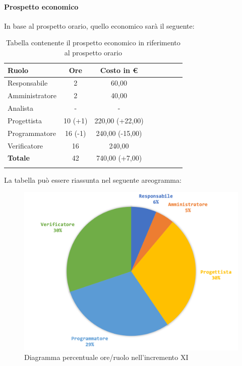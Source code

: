 		\paragraph{Prospetto economico}
		In base al prospetto orario, quello economico sarà il seguente: 
		
		\begin{longtable}{|l|c|c|c|c|c|c|c|}
			\hline
			\rowcolor{lighter-grayer}
			\textbf{Ruolo} & \textbf{Ore} & \textbf{Costo in € } \\
			\hline
			\endfirsthead
			
			\hline
			Responsabile 	    & 2 & 60,00\\
			\hline 
			\hline
			Amministratore	   & 2 & 40,00\\
			\hline
			\hline
			Analista 				& - & -\\
			\hline
			\hline
			Progettista 		   & 10 (+1) & 220,00 (+22,00)\\
			\hline
			\hline
			Programmatore 	  & 16 (-1) & 240,00 (-15,00)\\
			\hline
			\hline
			Verificatore 		   & 16 & 240,00\\
			\hline
			\textbf{Totale} 	 & 42 & 740,00 (+7,00)\\
			\hline
			\caption{Tabella contenente il prospetto economico in riferimento al prospetto orario}
		\end{longtable}

		La tabella può essere riassunta nel seguente areogramma:
		\begin{figure}[H]
			\centering
			\includegraphics[width=0.8\linewidth]{./images/consuntivo/ConsIncr11-2.png}
			\caption{Diagramma percentuale ore/ruolo nell'incremento XI}
			\label{fig:consuntivo diagramma costi ruolo incremento XI}
		\end{figure}
		\pagebreak
		
